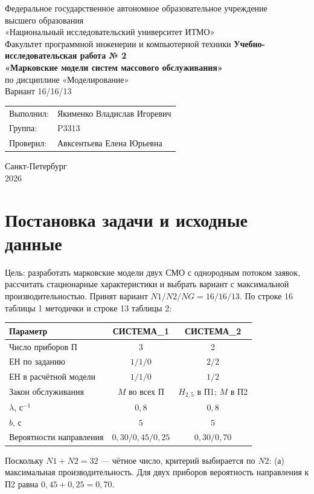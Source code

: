 \documentclass[12pt,a4paper]{article}
\begin{document}
\begin{titlepage}
\centering
Федеральное государственное автономное образовательное учреждение\\
высшего образования\\
«Национальный исследовательский университет ИТМО»\\[5mm]
Факультет программной инженерии и компьютерной техники
\vfill
{\large\bfseries Учебно-исследовательская работа № 2}\\[5mm]
{\large\bfseries «Марковские модели систем массового обслуживания»}\\[5mm]
по дисциплине «Моделирование»\\[3mm]
Вариант 16/16/13
\vfill
\begin{flushright}
\begin{tabular}{ll}
Выполнил: & Якименко Владислав Игоревич\\
Группа: & P3313\\
Проверил: & Авксентьева Елена Юрьевна
\end{tabular}
\end{flushright}
\vfill
Санкт-Петербург\\2026
\end{titlepage}
\setcounter{page}{2}
\section{Постановка задачи и исходные данные}
Цель: разработать марковские модели двух СМО с однородным потоком заявок, рассчитать стационарные характеристики и выбрать вариант с максимальной производительностью.
Принят вариант $N1/N2/NG=16/16/13$. По строке 16 таблицы 1 методички и строке 13 таблицы 2:
\begin{center}\small\renewcommand{\arraystretch}{1.4}
\begin{tabular}{|l|c|c|}\hline
Параметр&СИСТЕМА\_1&СИСТЕМА\_2\\\hline
Число приборов П&3&2\\\hline
ЕН по заданию&$1/1/0$&$2/2$\\\hline
ЕН в расчётной модели&$1/1/0$&$1/2$\\\hline
Закон обслуживания&$M$ во всех П&$H_{2{,}5}$ в П1; $M$ в П2\\\hline
$\lambda$, с$^{-1}$&$0{,}8$&$0{,}8$\\\hline
$b$, с&$5$&$5$\\\hline
Вероятности направления&$0{,}30/0{,}45/0{,}25$&$0{,}30/0{,}70$\\\hline
\end{tabular}\end{center}
Поскольку $N1+N2=32$ --- чётное число, критерий выбирается по $N2$: (а) максимальная производительность. Для двух приборов вероятность направления к П2 равна $0{,}45+0{,}25=0{,}70$.
\end{document}
